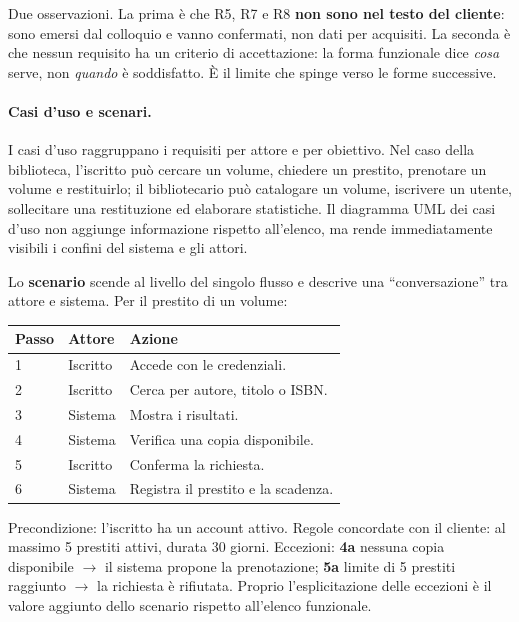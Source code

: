 \documentclass[12pt]{extarticle}
\begin{document}
\noindent Due osservazioni. La prima è che R5, R7 e R8 \textbf{non sono nel testo del cliente}: sono emersi dal colloquio e vanno confermati, non dati per acquisiti. La seconda è che nessun requisito ha un criterio di accettazione: la forma funzionale dice \textit{cosa} serve, non \textit{quando} è soddisfatto. È il limite che spinge verso le forme successive.

\paragraph{Casi d'uso e scenari.}
I casi d'uso raggruppano i requisiti per attore e per obiettivo. Nel caso della biblioteca, l'iscritto può cercare un volume, chiedere un prestito, prenotare un volume e restituirlo; il bibliotecario può catalogare un volume, iscrivere un utente, sollecitare una restituzione ed elaborare statistiche. Il diagramma UML dei casi d'uso non aggiunge informazione rispetto all'elenco, ma rende immediatamente visibili i confini del sistema e gli attori.

\noindent Lo \textbf{scenario} scende al livello del singolo flusso e descrive una ``conversazione'' tra attore e sistema. Per il prestito di un volume:

\begin{center}
\small
\begin{tabular}{p{1.2cm}p{5.2cm}p{8.8cm}}
    \toprule
    \textbf{Passo} & \textbf{Attore} & \textbf{Azione} \\
    \midrule
    1 & Iscritto & Accede con le credenziali. \\
    2 & Iscritto & Cerca per autore, titolo o ISBN. \\
    3 & Sistema & Mostra i risultati. \\
    4 & Sistema & Verifica una copia disponibile. \\
    5 & Iscritto & Conferma la richiesta. \\
    6 & Sistema & Registra il prestito e la scadenza. \\
    \bottomrule
\end{tabular}
\end{center}

\noindent Precondizione: l'iscritto ha un account attivo. Regole concordate con il cliente: al massimo 5 prestiti attivi, durata 30 giorni. Eccezioni: \textbf{4a} nessuna copia disponibile $\rightarrow$ il sistema propone la prenotazione; \textbf{5a} limite di 5 prestiti raggiunto $\rightarrow$ la richiesta è rifiutata. Proprio l'esplicitazione delle eccezioni è il valore aggiunto dello scenario rispetto all'elenco funzionale.
\end{document}
